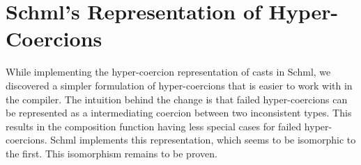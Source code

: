 \documentclass[acmtog, authorversion, acmlarge]{acmart}
\begin{document}
\clearpage

\section{Schml's Representation of Hyper-Coercions}
\label{sec:schml}

While implementing the hyper-coercion representation of casts in
Schml, we discovered a simpler formulation of hyper-coercions that is
easier to work with in the compiler.  The intuition behind the change
is that failed hyper-coercions can be represented as a intermediating
coercion between two inconsistent types.  This results in the
composition function having less special cases for failed
hyper-coercions.  Schml implements this representation, which seems to
be isomorphic to the first. This isomorphism remains to be proven.
\end{document}
